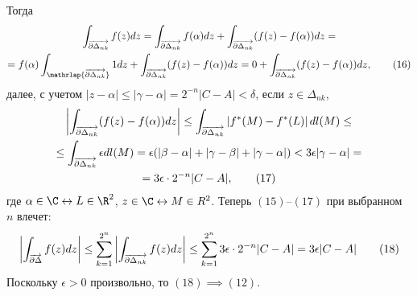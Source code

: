 \documentclass[main]{subfiles}
\begin{document}
\begin{longProof}
    Тогда
    \begin{multline*}
        \AnClOrInt[\AnClOrCurve[\partial \Delta_{nk}]] f(z) dz = \AnClOrInt[\AnClOrCurve[\partial \Delta_{nk}]] f(\alpha) dz + \AnClOrInt[\AnClOrCurve[\partial \Delta_{nk}]] (f(z) - f(\alpha)) dz =\\
        = f(\alpha) \AnClOrInt[\mathrlap{\AnClOrCurve[\partial \Delta_{nk}]}] 1 dz + \AnClOrInt[\AnClOrCurve[\partial \Delta_{nk}]] (f(z) - f(\alpha)) dz = 0 + \AnClOrInt[\AnClOrCurve[\partial \Delta_{nk}]] (f(z) - f(\alpha)) dz, \tag{16}
    \end{multline*}
    далее, с учетом $|z - \alpha| \le |\gamma - \alpha| = 2^{-n} |C - A| < \delta$, если $z \in \Delta_{nk}$,
    \begin{multline*}
        \left| \AnClOrInt[\AnClOrCurve[\partial \Delta_{nk}]] (f(z) - f(\alpha)) dz \right| \le \AnClOrInt[\AnClOrCurve[\partial \Delta_{nk}]] \left| f^*(M) - f^*(L) \right| dl(M) \le \\
        \le \AnClOrInt[\AnClOrCurve[\partial \Delta_{nk}]] \epsilon dl(M) = \epsilon (|\beta - \alpha| + |\gamma - \beta| + |\gamma - \alpha|) < 3 \epsilon |\gamma - \alpha| = \\
        = 3 \epsilon \cdot 2^{-n}|C - A|, \tag{17}
    \end{multline*}
    где $\alpha \in \C \leftrightarrow L \in \R^2$, $z \in \C \leftrightarrow M \in R^2$.
    Теперь $(15)$--$(17)$ при выбранном $n$ влечет:
    \[\left| \AnClOrInt[\AnClOrCurve[\partial \Delta]] f(z) dz \right| \le \sum_{k=1}^{2^n} \left| \AnClOrInt[\AnClOrCurve[\partial \Delta_{nk}]] f(z) dz \right| \le \sum_{k=1}^{2^n} 3 \epsilon \cdot 2^{-n}|C - A| = 3 \epsilon |C - A| \tag{18}\]
    Поскольку $\epsilon > 0$ произвольно, то $(18) \implies (12)$.
\end{longProof}
\end{document}
